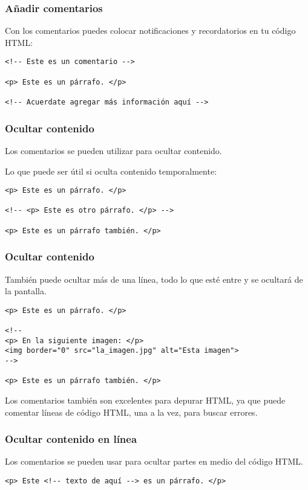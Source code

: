 \begin{frame}[fragile]
  \frametitle{Añadir comentarios}

  Con los comentarios puedes colocar notificaciones y
  recordatorios en tu código HTML:

  \vspace{\baselineskip}
  \begin{lstlisting}
<!-- Este es un comentario -->

<p> Este es un párrafo. </p>

<!-- Acuerdate agregar más información aquí -->
  \end{lstlisting}
\end{frame}

\begin{frame}[fragile]
  \frametitle{Ocultar contenido}

  Los comentarios se pueden utilizar para ocultar contenido.

  \vspace{\baselineskip}
  Lo que puede ser útil si oculta contenido temporalmente:

  \vspace{\baselineskip}
  \begin{lstlisting}
<p> Este es un párrafo. </p>

<!-- <p> Este es otro párrafo. </p> -->

<p> Este es un párrafo también. </p>
  \end{lstlisting}
\end{frame}

\begin{frame}[fragile]
  \frametitle{Ocultar contenido}

  También puede ocultar más de una línea, todo lo que esté
  entre \eti{<!--} y se ocultará \eti{-->} de la pantalla.

  \vspace{\baselineskip}
  \begin{lstlisting}
<p> Este es un párrafo. </p>

<!--
<p> En la siguiente imagen: </p>
<img border="0" src="la_imagen.jpg" alt="Esta imagen">
-->

<p> Este es un párrafo también. </p>
  \end{lstlisting}

  \vspace{\baselineskip}
  Los comentarios también son excelentes para depurar HTML, ya
  que puede comentar líneas de código HTML, una a la vez, para
  buscar errores.
\end{frame}

\begin{frame}[fragile]
  \frametitle{Ocultar contenido en línea}

  Los comentarios se pueden usar para ocultar partes en
  medio del código HTML.

  \vspace{\baselineskip}
  \begin{lstlisting}
<p> Este <!-- texto de aquí --> es un párrafo. </p>
  \end{lstlisting}
\end{frame}
